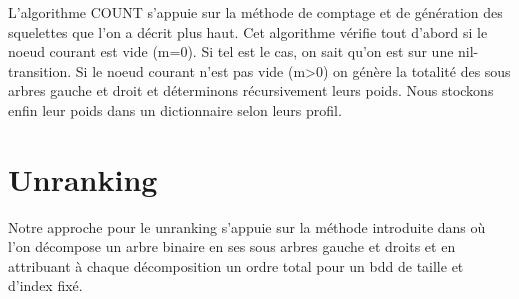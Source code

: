 \documentclass[french]{article}
\begin{document}
L'algorithme COUNT s'appuie sur la méthode de comptage et de génération des squelettes que l'on a décrit plus haut. Cet algorithme vérifie tout d'abord si le noeud courant est vide (m=0). Si tel est le cas, on sait qu'on est sur une nil-transition. Si le noeud courant n'est pas vide (m>0) on génère la totalité des sous arbres gauche et droit et déterminons récursivement leurs poids. Nous stockons enfin leur poids dans un dictionnaire selon leurs profil.
\begin{algorithm}
  \begin{algorithmic}[1]
    \Statex
      \State {}
      \State {} 
        \State {}
            \State {}
        \EndIf
      \Else
            \State {}
            \Else
                \EndFor
            \EndIf
                \State {}
                \State {}
                \Else
                        \State {}
                    \EndFor
                \EndIf
                    \State {}
                    \State {}
                    \Else
                    \EndIf\EndFor\EndFor\EndFor\EndIf
      \State {}
    \EndFunction
  \end{algorithmic}
\end{algorithm}

\newpage
\section{Unranking}
Notre approche pour le unranking s'appuie sur la méthode introduite dans \cite{wilf} où l'on décompose un arbre binaire en ses sous arbres gauche et droits et en attribuant à chaque décomposition un ordre total pour un bdd de taille et d'index fixé.
\end{document}
